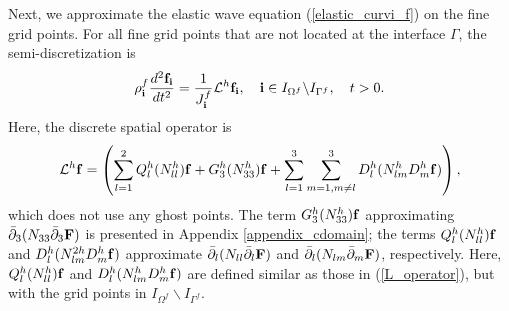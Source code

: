 Next, we approximate the elastic wave equation (\ref{elastic_curvi_f}) on the fine grid points. For all fine grid points that are not located at the interface $\Gamma$, the semi-discretization  is
\begin{equation}\label{elastic_semi_f}
{\rho}_{\bf i}^{f}\frac{d^2{{\bf f}_{\bf i}}}{dt^2} = \frac{1}{J^f_{\bf i}}{\mathcal{L}}^{h} {{\bf f}}_{\bf i},\quad {\bf i}\in I_{\Omega^f}\backslash I_{{\Gamma^f}},\quad t>0.
\end{equation}
Here, the discrete spatial operator is
\begin{equation}\label{Lf_operator}
{\mathcal{L}}^{h} {{\bf f}} = \left(\sum_{l=1}^2{Q}_l^{h}({N}_{ll}^h){\bf f}+{G}_3^{h}({N}_{33}^h){\bf f}+\sum_{l=1}^3\sum_{m=1,m\neq l}^3{D}_l^{h}({N}_{lm}^{h}{D}_m^{h}{\bf f})\right),
\end{equation}
which does not use any ghost points. The term ${G}_3^{h}(N_{33}^{h}){\bf f}$ approximating $\bar{\partial}_3(N_{33}\bar{\partial}_3 {\bf F})$ is presented in Appendix \ref{appendix_cdomain}; the terms $Q_l^{h}(N_{ll}^{h}){\bf f}$ and $D_{l}^{h}(N_{lm}^{2h}D_m^{h}{\bf f})$ approximate $\bar{\partial}_l(N_{ll}\bar{\partial}_l{\bf F})$ and $\bar{\partial}_l(N_{lm}\bar{\partial}_m {\bf F})$, respectively. Here, ${Q}_l^{h}({N}_{ll}^h){\bf f}$ and ${D}_l^{h}({N}_{lm}^{h}{D}_m^{h}{\bf f})$ are defined similar as those in (\ref{L_operator}), but with the grid points in $I_{\Omega^f}\backslash I_{{\Gamma^f}}$.

